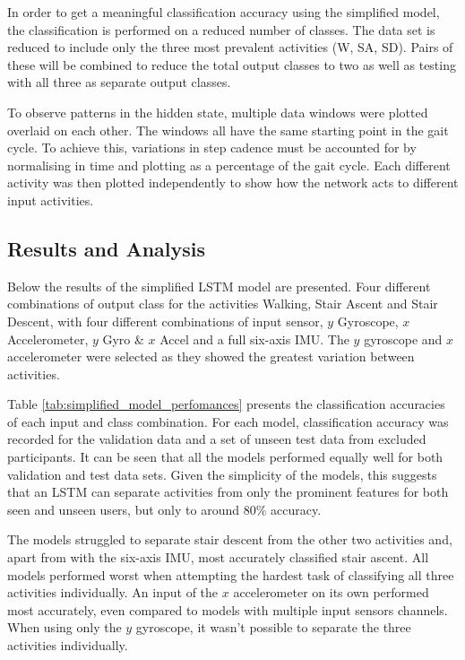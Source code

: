 \documentclass[sensors,article,submit,moreauthors,pdftex]{Definitions/mdpi}
\begin{document}
In order to get a meaningful classification accuracy using the simplified model, the classification is performed on a reduced number of classes. The data set is reduced to include only the three most prevalent activities (W, SA, SD). Pairs of these will be combined to reduce the total output classes to two as well as testing with all three as separate output classes.

To observe patterns in the hidden state, multiple data windows were plotted overlaid on each other. The windows all have the same starting point in the gait cycle. To achieve this, variations in step cadence must be accounted for by normalising in time and plotting as a percentage of the gait cycle. Each different activity was then plotted independently to show how the network acts to different input activities.

\subsection{Results and Analysis}

Below the results of the simplified LSTM model are presented. Four different combinations of output class for the activities Walking, Stair Ascent and Stair Descent, with four different combinations of input sensor, $y$ Gyroscope, $x$ Accelerometer, $y$ Gyro \& $x$ Accel and a full six-axis IMU. The $y$ gyroscope and $x$ accelerometer were selected as they showed the greatest variation between activities.

Table \ref{tab:simplified_model_perfomances} presents the classification accuracies of each input and class combination. For each model, classification accuracy was recorded for the validation data and a set of unseen test data from excluded participants. It can be seen that all the models performed equally well for both validation and test data sets. Given the simplicity of the models, this suggests that an LSTM can separate activities from only the prominent features for both seen and unseen users, but only to around 80\% accuracy.

The models struggled to separate stair descent from the other two activities and, apart from with the six-axis IMU, most accurately classified stair ascent. All models performed worst when attempting the hardest task of classifying all three activities individually. An input of the $x$ accelerometer on its own performed most accurately, even compared to models with multiple input sensors channels. When using only the $y$ gyroscope, it wasn't possible to separate the three activities individually.
\end{document}
